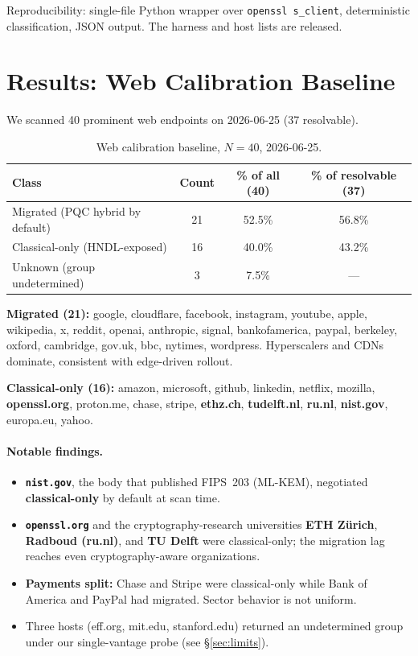 \documentclass[11pt]{article}
\newcommand{\code}[1]{\texttt{#1}}
\begin{document}
Reproducibility: single-file Python wrapper over \code{openssl s\_client},
deterministic classification, JSON output. The harness and host lists are released.

\section{Results: Web Calibration Baseline}
\label{sec:web}

We scanned 40 prominent web endpoints on 2026-06-25 (37 resolvable).

\begin{table}[h]
\centering
\begin{tabular}{lccc}
\toprule
Class & Count & \% of all (40) & \% of resolvable (37) \\
\midrule
Migrated (PQC hybrid by default) & 21 & 52.5\% & 56.8\% \\
Classical-only (HNDL-exposed)    & 16 & 40.0\% & 43.2\% \\
Unknown (group undetermined)     & 3  & 7.5\%  & --- \\
\bottomrule
\end{tabular}
\caption{Web calibration baseline, $N=40$, 2026-06-25.}
\label{tab:web}
\end{table}

\textbf{Migrated (21):} google, cloudflare, facebook, instagram, youtube, apple,
wikipedia, x, reddit, openai, anthropic, signal, bankofamerica, paypal, berkeley,
oxford, cambridge, gov.uk, bbc, nytimes, wordpress. Hyperscalers and CDNs dominate,
consistent with edge-driven rollout.

\textbf{Classical-only (16):} amazon, microsoft, github, linkedin, netflix, mozilla,
\textbf{openssl.org}, proton.me, chase, stripe, \textbf{ethz.ch}, \textbf{tudelft.nl},
\textbf{ru.nl}, \textbf{nist.gov}, europa.eu, yahoo.

\paragraph{Notable findings.}
\begin{itemize}
  \item \textbf{\code{nist.gov}}, the body that published FIPS~203 (ML-KEM),
        negotiated \textbf{classical-only} by default at scan time.
  \item \textbf{\code{openssl.org}} and the cryptography-research universities
        \textbf{ETH Z\"urich}, \textbf{Radboud (ru.nl)}, and \textbf{TU Delft} were
        classical-only; the migration lag reaches even cryptography-aware
        organizations.
  \item \textbf{Payments split:} Chase and Stripe were classical-only while Bank of
        America and PayPal had migrated. Sector behavior is not uniform.
  \item Three hosts (eff.org, mit.edu, stanford.edu) returned an undetermined group
        under our single-vantage probe (see \S\ref{sec:limits}).
\end{itemize}
\end{document}
